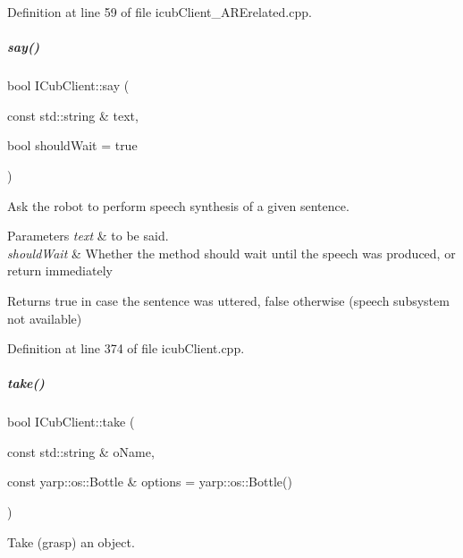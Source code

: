 Definition at line 59 of file icub\+Client\+\_\+\+A\+R\+Erelated.\+cpp.

\mbox{\label{group__icubclient__clients_aee94220297bc4131cd0236838ec8027d}} 
\subparagraph{\texorpdfstring{say()}{say()}}
{\footnotesize\ttfamily bool I\+Cub\+Client\+::say (\begin{DoxyParamCaption}\item[{const std\+::string \&}]{text,  }\item[{bool}]{should\+Wait = {\ttfamily true} }\end{DoxyParamCaption})}



Ask the robot to perform speech synthesis of a given sentence. 


\begin{DoxyParams}{Parameters}
{\em text} & to be said. \\
\hline
{\em should\+Wait} & Whether the method should wait until the speech was produced, or return immediately \\
\hline
\end{DoxyParams}
\begin{DoxyReturn}{Returns}
true in case the sentence was uttered, false otherwise (speech subsystem not available) 
\end{DoxyReturn}


Definition at line 374 of file icub\+Client.\+cpp.

\mbox{\label{group__icubclient__clients_ab719d817deb3de266ea75e5a84898702}} 
\subparagraph{\texorpdfstring{take()}{take()}}
{\footnotesize\ttfamily bool I\+Cub\+Client\+::take (\begin{DoxyParamCaption}\item[{const std\+::string \&}]{o\+Name,  }\item[{const yarp\+::os\+::\+Bottle \&}]{options = {\ttfamily yarp\+:\+:os\+:\+:Bottle()} }\end{DoxyParamCaption})}



Take (grasp) an object. 

